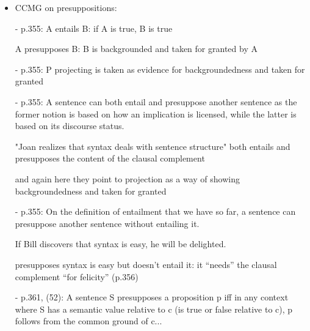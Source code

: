 \documentclass[11pt,fleqn]{article}
\newcommand{\6}{\mbox{$[\hspace*{-.6mm}[$}}
\newcommand{\9}{\mbox{$]\hspace*{-.6mm}]$}}
\begin{document}
{\begin{itemize}
\begin{itemize}
\begin{itemize}
\item Beaver 01: p.67: ``There is good reason to remain suspicious of non-entailed presuppositions, for making this move creates as many problems as it solves.'' ARGUMENTS ARE NOT OF EMPIRICAL NATURE BUT RATHER BASED ON CANCELLATION ACCOUNTS MAKING WRONG PREDICTIONS

\end{itemize}

{\bf which of these are found with {\em falsely}?}

\begin{itemize}

\item ``falsely annoyed that'': no hits

\item ``falsely annoyed NP'' HITS!


\end{itemize}

\end{itemize}


\item CCMG on presuppositions:


- p.355: A entails B: if A is true, B is true

A presupposes B: B is backgrounded and taken for granted by A

- p.355: P projecting is taken as evidence for backgroundedness and taken for granted

- p.355: A sentence can both entail and presuppose another sentence as the former notion is based on how an implication is licensed, while the latter is based on its discourse status. 

"Joan realizes that syntax deals with sentence structure" both entails and presupposes the content of the clausal complement

and again here they point to projection as a way of showing backgroundedness and taken for granted

- p.355: On the definition of entailment that we have so far, a sentence can presuppose another sentence without entailing it.

If Bill discovers that syntax is easy, he will be delighted.

presupposes syntax is easy but doesn't entail it: it ``needs'' the clausal  complement ``for felicity'' (p.356)

- p.361, (52): A sentence S presupposes a proposition p iff in any context where S has a semantic value relative to c (is true or false relative to c), p follows from the common ground of c...


\end{itemize}}
\end{document}

